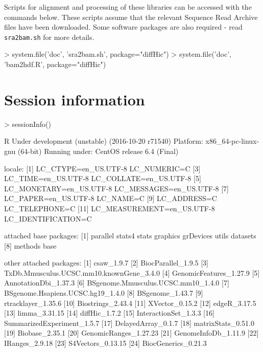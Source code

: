 \documentclass[12pt]{report}
\renewenvironment{Schunk}{\vspace{0pt}}{\vspace{0pt}}
\newcommand{\code}[1]{{\small\texttt{#1}}}
\begin{document}
Scripts for alignment and processing of these libraries can be accessed with the commands below.
These scripts assume that the relevant Sequence Read Archive files have been downloaded.
Some software packages are also required - read \code{sra2bam.sh} for more details.

\begin{Schunk}
\begin{Sinput}
> system.file('doc', 'sra2bam.sh', package="diffHic")
> system.file('doc', 'bam2hdf.R', package="diffHic")
\end{Sinput}
\end{Schunk}

\section{Session information}
\begin{Schunk}
\begin{Sinput}
> sessionInfo()
\end{Sinput}
\begin{Soutput}
R Under development (unstable) (2016-10-20 r71540)
Platform: x86_64-pc-linux-gnu (64-bit)
Running under: CentOS release 6.4 (Final)

locale:
 [1] LC_CTYPE=en_US.UTF-8       LC_NUMERIC=C              
 [3] LC_TIME=en_US.UTF-8        LC_COLLATE=en_US.UTF-8    
 [5] LC_MONETARY=en_US.UTF-8    LC_MESSAGES=en_US.UTF-8   
 [7] LC_PAPER=en_US.UTF-8       LC_NAME=C                 
 [9] LC_ADDRESS=C               LC_TELEPHONE=C            
[11] LC_MEASUREMENT=en_US.UTF-8 LC_IDENTIFICATION=C       

attached base packages:
[1] parallel  stats4    stats     graphics  grDevices utils     datasets 
[8] methods   base     

other attached packages:
 [1] csaw_1.9.7                              
 [2] BiocParallel_1.9.5                      
 [3] TxDb.Mmusculus.UCSC.mm10.knownGene_3.4.0
 [4] GenomicFeatures_1.27.9                  
 [5] AnnotationDbi_1.37.3                    
 [6] BSgenome.Mmusculus.UCSC.mm10_1.4.0      
 [7] BSgenome.Hsapiens.UCSC.hg19_1.4.0       
 [8] BSgenome_1.43.7                         
 [9] rtracklayer_1.35.6                      
[10] Biostrings_2.43.4                       
[11] XVector_0.15.2                          
[12] edgeR_3.17.5                            
[13] limma_3.31.15                           
[14] diffHic_1.7.2                           
[15] InteractionSet_1.3.3                    
[16] SummarizedExperiment_1.5.7              
[17] DelayedArray_0.1.7                      
[18] matrixStats_0.51.0                      
[19] Biobase_2.35.1                          
[20] GenomicRanges_1.27.23                   
[21] GenomeInfoDb_1.11.9                     
[22] IRanges_2.9.18                          
[23] S4Vectors_0.13.15                       
[24] BiocGenerics_0.21.3                     


\end{Soutput}
\end{Schunk}
\end{document}
